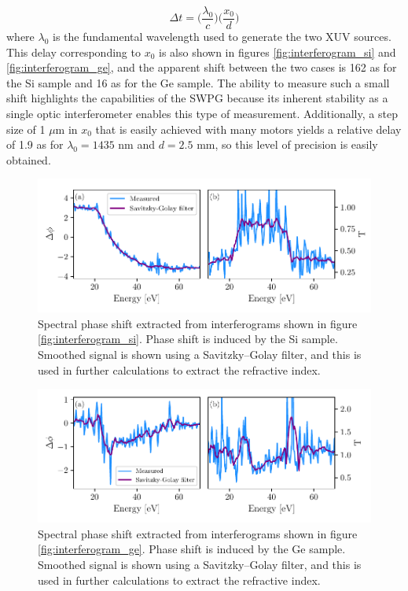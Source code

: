 \begin{equation}
	\label{eqn:phase_to_delay}
	\Delta t  = \bigg(\frac{\lambda_0}{c}\bigg)\bigg(\frac{x_0}{d}\bigg)
\end{equation}
where $\lambda_0$ is the fundamental wavelength used to generate the two XUV sources. This delay corresponding to $x_0$ is also shown in figures \ref{fig:interferogram_si} and \ref{fig:interferogram_ge}, and the apparent shift between the two cases is 162 as for the Si sample and 16 as for the Ge sample.  The ability to measure such a small shift highlights the capabilities of the SWPG because its inherent stability as a single optic interferometer enables this type of measurement.  Additionally, a step size of 1 $\mu$m in $x_0$ that is easily achieved with many motors yields a relative delay of 1.9 as for $\lambda_0=1435$ nm and $d=2.5$ mm, so this level of precision is easily obtained. 

\begin{figure}
	\centering
	\includegraphics[width=1.0\textwidth]{figures/refractive_index/FTS_delta.pdf}
	\caption[Measured phase shift using SWPG FTS in silicon]{Spectral phase shift extracted from interferograms shown in figure \ref{fig:interferogram_si}. Phase shift is induced by the Si sample.  Smoothed signal is shown using a Savitzky–Golay filter, and this is used in further calculations to extract the refractive index.}
	\label{fig:FTS_phase_si}
\end{figure}

\begin{figure}
	\centering
	\includegraphics[width=1.0\textwidth]{figures/refractive_index/FTS_delta_ge.pdf}
	\caption[Measured phase shift using SWPG FTS in germanium]{Spectral phase shift extracted from interferograms shown in figure \ref{fig:interferogram_ge}. Phase shift is induced by the Ge sample. Smoothed signal is shown using a Savitzky–Golay filter, and this is used in further calculations to extract the refractive index.}
	\label{fig:FTS_phase_ge}
\end{figure}

